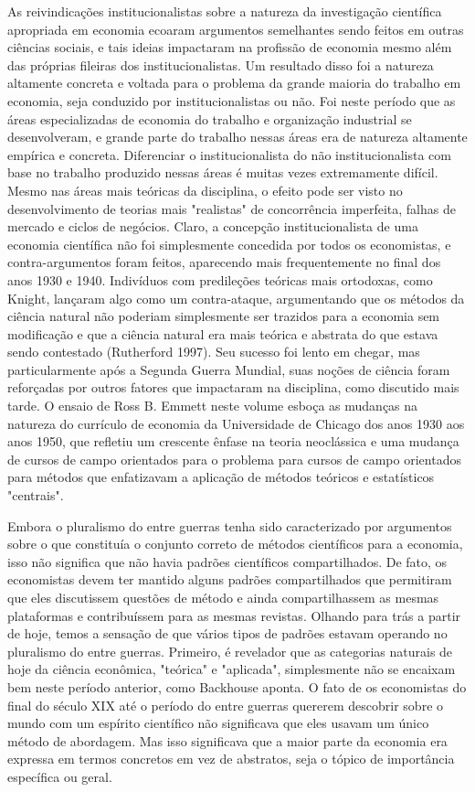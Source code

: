 \documentclass[12pt]{article}
\begin{document}
As reivindicações institucionalistas sobre a natureza da investigação científica apropriada em economia ecoaram argumentos semelhantes sendo feitos em outras ciências sociais, e tais ideias impactaram na profissão de economia mesmo além das próprias fileiras dos institucionalistas. Um resultado disso foi a natureza altamente concreta e voltada para o problema da grande maioria do trabalho em economia, seja conduzido por institucionalistas ou não. Foi neste período que as áreas especializadas de economia do trabalho e organização industrial se desenvolveram, e grande parte do trabalho nessas áreas era de natureza altamente empírica e concreta. Diferenciar o institucionalista do não institucionalista com base no trabalho produzido nessas áreas é muitas vezes extremamente difícil. Mesmo nas áreas mais teóricas da disciplina, o efeito pode ser visto no desenvolvimento de teorias mais "realistas" de concorrência imperfeita, falhas de mercado e ciclos de negócios. Claro, a concepção institucionalista de uma economia científica não foi simplesmente concedida por todos os economistas, e contra-argumentos foram feitos, aparecendo mais frequentemente no final dos anos 1930 e 1940. Indivíduos com predileções teóricas mais ortodoxas, como Knight, lançaram algo como um contra-ataque, argumentando que os métodos da ciência natural não poderiam simplesmente ser trazidos para a economia sem modificação e que a ciência natural era mais teórica e abstrata do que estava sendo contestado (Rutherford 1997). Seu sucesso foi lento em chegar, mas particularmente após a Segunda Guerra Mundial, suas noções de ciência foram reforçadas por outros fatores que impactaram na disciplina, como discutido mais tarde. O ensaio de Ross B. Emmett neste volume esboça as mudanças na natureza do currículo de economia da Universidade de Chicago dos anos 1930 aos anos 1950, que refletiu um crescente ênfase na teoria neoclássica e uma mudança de cursos de campo orientados para o problema para cursos de campo orientados para métodos que enfatizavam a aplicação de métodos teóricos e estatísticos "centrais".

Embora o pluralismo do entre guerras tenha sido caracterizado por argumentos sobre o que constituía o conjunto correto de métodos científicos para a economia, isso não significa que não havia padrões científicos compartilhados. De fato, os economistas devem ter mantido alguns padrões compartilhados que permitiram que eles discutissem questões de método e ainda compartilhassem as mesmas plataformas e contribuíssem para as mesmas revistas. Olhando para trás a partir de hoje, temos a sensação de que vários tipos de padrões estavam operando no pluralismo do entre guerras. Primeiro, é revelador que as categorias naturais de hoje da ciência econômica, "teórica" e "aplicada", simplesmente não se encaixam bem neste período anterior, como Backhouse aponta. O fato de os economistas do final do século XIX até o período do entre guerras quererem descobrir sobre o mundo com um espírito científico não significava que eles usavam um único método de abordagem. Mas isso significava que a maior parte da economia era expressa em termos concretos em vez de abstratos, seja o tópico de importância específica ou geral.
\end{document}

